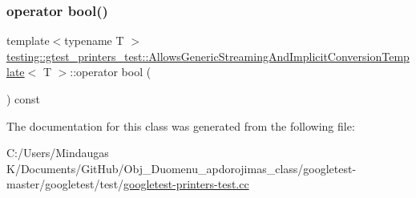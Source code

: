 \subsubsection{\texorpdfstring{operator bool()}{operator bool()}\hspace{0.1cm}{\footnotesize\ttfamily [3/3]}}
{\footnotesize\ttfamily template$<$typename T $>$ \\
\mbox{\hyperlink{classtesting_1_1gtest__printers__test_1_1_allows_generic_streaming_and_implicit_conversion_template}{testing\+::gtest\+\_\+printers\+\_\+test\+::\+Allows\+Generic\+Streaming\+And\+Implicit\+Conversion\+Template}}$<$ T $>$\+::operator bool (\begin{DoxyParamCaption}{ }\end{DoxyParamCaption}) const\hspace{0.3cm}{\ttfamily [inline]}}



The documentation for this class was generated from the following file\+:\begin{DoxyCompactItemize}
\item 
C\+:/\+Users/\+Mindaugas K/\+Documents/\+Git\+Hub/\+Obj\+\_\+\+Duomenu\+\_\+apdorojimas\+\_\+class/googletest-\/master/googletest/test/\mbox{\hyperlink{googletest-master_2googletest_2test_2googletest-printers-test_8cc}{googletest-\/printers-\/test.\+cc}}\end{DoxyCompactItemize}
